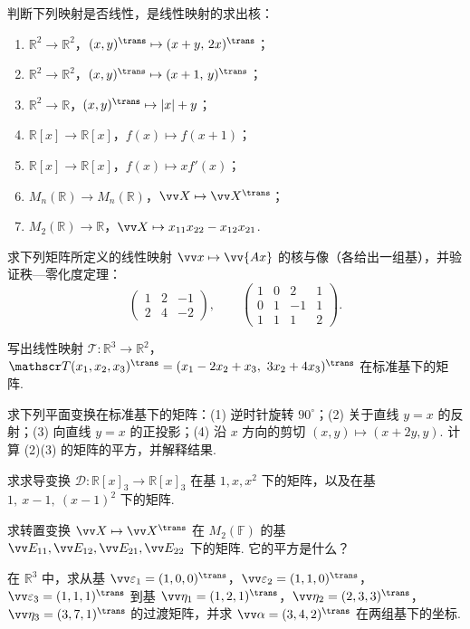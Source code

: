 {\begin{exA}
			\item\label{ex:lmap:A13} 判断下列映射是否线性，是线性映射的求出核：
			\begin{enumerate}
				\item $\mathbb{R}^2\to\mathbb{R}^2$，$(x,y)^\trans\mapsto(x+y,\,2x)^\trans$；
				\item $\mathbb{R}^2\to\mathbb{R}^2$，$(x,y)^\trans\mapsto(x+1,\,y)^\trans$；
				\item $\mathbb{R}^2\to\mathbb{R}$，$(x,y)^\trans\mapsto|x|+y$；
				\item $\mathbb{R}[x]\to\mathbb{R}[x]$，$f(x)\mapsto f(x+1)$；
				\item $\mathbb{R}[x]\to\mathbb{R}[x]$，$f(x)\mapsto xf'(x)$；
				\item $M_n(\mathbb{R})\to M_n(\mathbb{R})$，$\vv X\mapsto\vv X^\trans$；
				\item $M_2(\mathbb{R})\to\mathbb{R}$，$\vv X\mapsto x_{11}x_{22}-x_{12}x_{21}$.
			\end{enumerate}
			\item\label{ex:lmap:A14} 求下列矩阵所定义的线性映射 $\vv x\mapsto\vv{Ax}$ 的核与像（各给出一组基），并验证秩—零化度定理：
			\[\begin{pmatrix}1&2&-1\\2&4&-2\end{pmatrix},\qquad\begin{pmatrix}1&0&2&1\\0&1&-1&1\\1&1&1&2\end{pmatrix}.\]
			\item\label{ex:lmap:A15} 写出线性映射 $\mathscr T:\mathbb{R}^3\to\mathbb{R}^2$，$\mathscr T(x_1,x_2,x_3)^\trans=(x_1-2x_2+x_3,\ 3x_2+4x_3)^\trans$ 在标准基下的矩阵.
			\item\label{ex:lmap:A16} 求下列平面变换在标准基下的矩阵：(1) 逆时针旋转 $90^\circ$；(2) 关于直线 $y=x$ 的反射；(3) 向直线 $y=x$ 的正投影；(4) 沿 $x$ 方向的剪切 $(x,y)\mapsto(x+2y,y)$. 计算 (2)(3) 的矩阵的平方，并解释结果.
			\item\label{ex:lmap:A17} 求求导变换 $\mathscr D:\mathbb{R}[x]_3\to\mathbb{R}[x]_3$ 在基 $1,x,x^2$ 下的矩阵，以及在基 $1,\ x-1,\ (x-1)^2$ 下的矩阵.
			\item\label{ex:lmap:A18} 求转置变换 $\vv X\mapsto\vv X^\trans$ 在 $M_2(\mathbb{F})$ 的基 $\vv E_{11},\vv E_{12},\vv E_{21},\vv E_{22}$ 下的矩阵. 它的平方是什么？
			\item\label{ex:lmap:A19} 在 $\mathbb{R}^3$ 中，求从基 $\vv\varepsilon_1=(1,0,0)^\trans$，$\vv\varepsilon_2=(1,1,0)^\trans$，$\vv\varepsilon_3=(1,1,1)^\trans$ 到基 $\vv\eta_1=(1,2,1)^\trans$，$\vv\eta_2=(2,3,3)^\trans$，$\vv\eta_3=(3,7,1)^\trans$ 的过渡矩阵，并求 $\vv\alpha=(3,4,2)^\trans$ 在两组基下的坐标.

\end{exA}}
